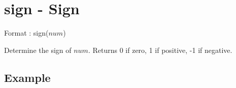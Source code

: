 
%

\section{sign - Sign\label{sect:sign}}

Format : sign($num$)

Determine the sign of $num$.
Returns 0 if zero, 1 if positive, -1 if negative. 

\subsection*{Example}


%

